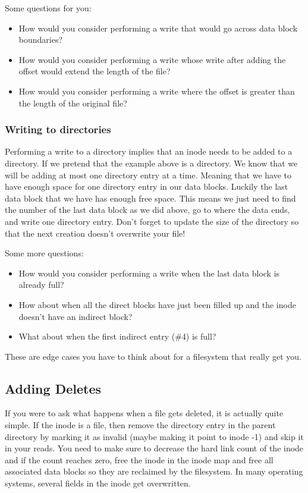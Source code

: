 Some questions for you:

\begin {itemize}
    \item How would you consider performing a write that would go across data block boundaries?
    \item How would you consider performing a write whose write after adding the offset would extend the length of the file?\item How would you consider performing a write where the offset is greater than the length of the original file?
\end{itemize}

\subsubsection{Writing to directories}
Performing a write to a directory implies that an inode needs to be added to a directory.
If we pretend that the example above is a directory.
We know that we will be adding at most one directory entry at a time.
Meaning that we have to have enough space for one directory entry in our data blocks.
Luckily the last data block that we have has enough free space.
This means we just need to find the number of the last data block as we did above, go to where the data ends, and write one directory entry.
Don't forget to update the size of the directory so that the next creation doesn't overwrite your file!

Some more questions: 

\begin{itemize}
    \item How would you consider performing a write when the last data block is already full?
    \item How about when all the direct blocks have just been filled up and the inode doesn't have an indirect block?
    \item What about when the first indirect entry (\#4) is full?
\end{itemize}

These are edge cases you have to think about for a filesystem that really get you.

\subsection{Adding Deletes}

If you were to ask what happens when a file gets deleted, it is actually quite simple.
If the inode is a file, then remove the directory entry in the parent directory by marking it as invalid (maybe making it point to inode -1) and skip it in your reads.
You need to make sure to decrease the hard link count of the inode and if the count reaches zero, free the inode in the inode map and free all associated data blocks so they are reclaimed by the filesystem.
In many operating systems, several fields in the inode get overwritten.

